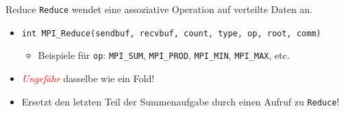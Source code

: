 \documentclass{beamer}
\begin{document}
\begin{frame}{Reduce}
	\texttt{Reduce} wendet eine assoziative Operation auf verteilte Daten an.

	\begin{figure}
	\end{figure}

	\begin{itemize}
		\item {\footnotesize \texttt{int MPI\_Reduce(sendbuf, recvbuf, count, type, op, root, comm)}}
                \begin{itemize}
                  \item Beispiele für \texttt{op}: \texttt{MPI\_SUM}, \texttt{MPI\_PROD}, \texttt{MPI\_MIN}, \texttt{MPI\_MAX}, etc.
                \end{itemize}
		\item \textcolor{red}{\emph{Ungefähr}} dasselbe wie ein Fold!
		\pause
		\item Ersetzt den letzten Teil der Summenaufgabe durch einen Aufruf zu \texttt{Reduce}!
	\end{itemize}
\end{frame}
\end{document}
